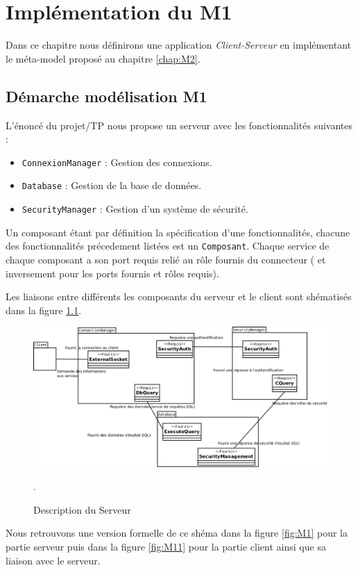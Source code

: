 \chapter{Implémentation du M1}
Dans ce chapitre nous définirons une application \textit{Client-Serveur} en implémentant le méta-model proposé au chapitre \ref{chap:M2}.

\section{Démarche modélisation M1}
L'énoncé du projet/TP nous propose un serveur avec les fonctionnalités suivantes :

\begin{itemize}
\item \verb+ConnexionManager+ :   Gestion des connexions. 
\item  \verb+Database+ :  Gestion de la base de données.
\item \verb+SecurityManager+ :  Gestion d'un système de sécurité.
\end{itemize}

Un composant étant par définition la spécification d'une fonctionnalités, chacune des fonctionnalités précedement listées est un \verb+Composant+. Chaque service de chaque composant a son port requis relié au rôle fournis  du connecteur ( et inversement pour les ports fournis et rôles requis).

Les liaisons entre différents les composants du serveur et le client sont shématisés dans la figure \ref{fig:desSer}. 
\begin{figure}[htb]
  \centering
  \includegraphics[scale=0.32]{img/DescribServeur}
  \caption{Description du Serveur}
  \label{fig:desSer}.
\end{figure}

Nous retrouvons une version formelle de ce shéma dans la figure \ref{fig:M1} pour la partie \og serveur \fg puis dans la figure \ref{fig:M11} pour la partie \og client \fg ainsi que sa liaison avec le serveur.

